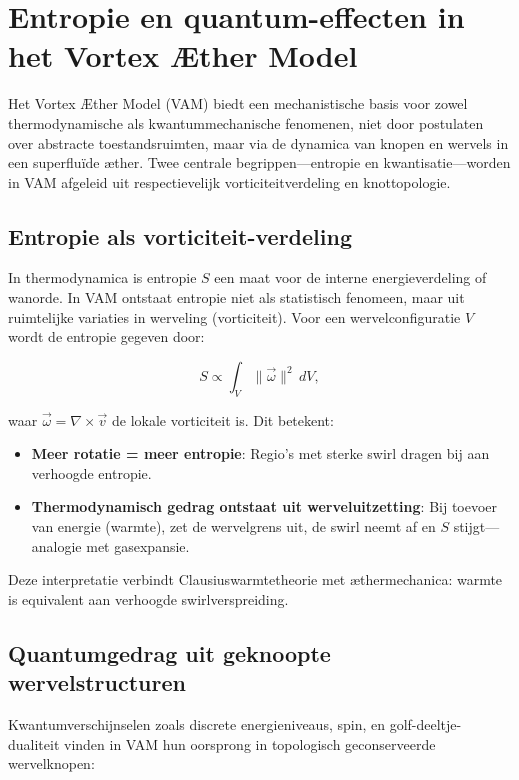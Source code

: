 
\section{Entropie en quantum-effecten in het Vortex Æther Model}

Het Vortex Æther Model (VAM) biedt een mechanistische basis voor zowel thermodynamische als kwantummechanische fenomenen, niet door postulaten over abstracte toestandsruimten, maar via de dynamica van knopen en wervels in een superfluïde æther. Twee centrale begrippen—entropie en kwantisatie—worden in VAM afgeleid uit respectievelijk vorticiteitverdeling en knottopologie.

\subsection{Entropie als vorticiteit-verdeling}

In thermodynamica is entropie $S$ een maat voor de interne energieverdeling of wanorde. In VAM ontstaat entropie niet als statistisch fenomeen, maar uit ruimtelijke variaties in werveling (vorticiteit). Voor een wervelconfiguratie $V$ wordt de entropie gegeven door:

\begin{equation}
S \propto \int_V \|\vec{\omega}\|^2 \, dV,
\end{equation}

waar $\vec{\omega} = \nabla \times \vec{v}$ de lokale vorticiteit is. Dit betekent:

\begin{itemize}
    \item \textbf{Meer rotatie = meer entropie}: Regio's met sterke swirl dragen bij aan verhoogde entropie.
    \item \textbf{Thermodynamisch gedrag ontstaat uit werveluitzetting}: Bij toevoer van energie (warmte), zet de wervelgrens uit, de swirl neemt af en $S$ stijgt—analogie met gasexpansie.
\end{itemize}

Deze interpretatie verbindt Clausius\rqs  warmtetheorie met æthermechanica: warmte is equivalent aan verhoogde swirlverspreiding.

\subsection{Quantumgedrag uit geknoopte wervelstructuren}

Kwantumverschijnselen zoals discrete energieniveaus, spin, en golf-deeltje-dualiteit vinden in VAM hun oorsprong in topologisch geconserveerde wervelknopen:

